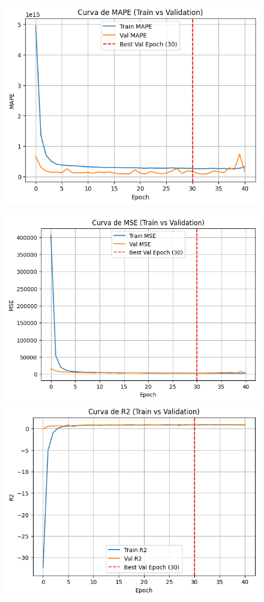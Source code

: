\begin{figure}[H]
\begin{minipage}{0.48\textwidth}
		\includegraphics[width=\linewidth]{includes/cap5/graphs/sid2_mlp_mape.png}
	\end{minipage}
	\hfill
	\begin{minipage}{0.48\textwidth}
		\centering
		\includegraphics[width=\linewidth]{includes/cap5/graphs/sid2_mlp_mse.png}
		\vspace{0.2cm}
		\includegraphics[width=\linewidth]{includes/cap5/graphs/sid2_mlp_r2.png}

\end{minipage}
\end{figure}
